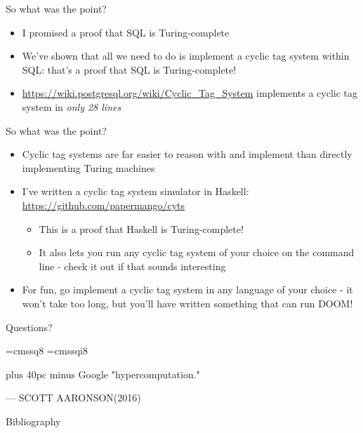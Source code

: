 \documentclass[aspectratio=169]{beamer}
\begin{document}
\begin{frame}{So what was the point?}
    \begin{itemize}
        \item I promised a proof that SQL is Turing-complete \pause
        \item We've shown that all we need to do is implement a cyclic tag system within SQL: that's a proof that SQL is Turing-complete! \pause
        \item \url{https://wiki.postgresql.org/wiki/Cyclic_Tag_System} implements a cyclic tag system in \textit{only 28 lines}
    \end{itemize}
\end{frame}

\begin{frame}{So what was the point?}
    \begin{itemize}
        \item Cyclic tag systems are far easier to reason with and implement than directly implementing Turing machines \pause
        \item I've written a cyclic tag system simulator in Haskell: \url{https://github.com/papermango/cyts} \pause
        \begin{itemize}
            \item This is a proof that Haskell is Turing-complete! \pause
            \item It also lets you run any cyclic tag system of your choice on the command line - check it out if that sounds interesting
        \end{itemize} \pause
        \item For fun, go implement a cyclic tag system in any language of your choice - it won't take too long, but you'll have written something that can run DOOM!
    \end{itemize}
\end{frame}

\begin{frame}{}
      \begin{center}
    {\color{sigma@mainblue} \LARGE Questions?}
  \end{center}
\end{frame}

\font\eightss=cmssq8
\font\eightssi=cmssqi8
\newcommand\quoteAuthorDate[3]{\begingroup
  \baselineskip 10pt
  \parfillskip 0pt
  \interlinepenalty 10000 %
  \leftskip 0pt plus 40pc minus \parindent
  \let\rm=\eightss
  \let\sl=\eightssi
  \everypar{\sl}#1\par
  \nobreak\smallskip
  \noindent\rm--- #2\unskip\enspace(#3)\par
  \endgroup}
\begin{frame}
    \begin{center}
        \item \quoteAuthorDate{Google "hypercomputation."}{SCOTT AARONSON}{\textcolor{sigma@mainblue}{2016}}
    \end{center}
\end{frame}

\begin{frame}[allowframebreaks]{Bibliography}
    \tiny
    
    
\end{frame}
\end{document}

